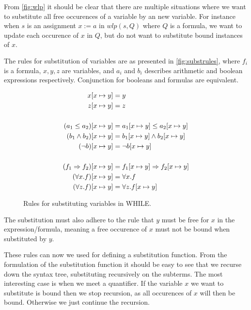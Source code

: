 From \autoref{fig:wlp} it should be clear that there are multiple situations where we want to substitute
all free occurences of a variable by an new variable.
For instance when $s$ is an assignment $x := a$ in $wlp(s, Q)$ where $Q$ is a formula,
we want to update each occurence of $x$ in $Q$, but do not want to substitute bound instances of $x$.

The rules for substitution of variables are as presented in \autoref{fig:substrules},
where $f_{i}$ is a formula, $x,y,z$ are variables, and $a_{i}$ and $b_{i}$ describes arithmetic and boolean expressions respectively. Conjunction for booleans and formulas are equivalent.

\begin{figure}[h!]
\begin{align*}
x[x \mapsto y] &= y \\
z[x \mapsto y] &= z \\
&\\
(a_{1} \leq a_{2})[x \mapsto y] &= a_{1}[x \mapsto y] \le a_{2}[x \mapsto y] \\
(b_{1} \wedge b_{2})[x \mapsto y] &= b_{1}[x \mapsto y] \wedge b_{2}[x \mapsto y] \\
(\neg b)[x \mapsto y] &= \neg b[x \mapsto y] \\
&\\
(f_{1} \Rightarrow f_{2})[x \mapsto y] &= f_{1}[x \mapsto y] \Rightarrow f_{2}[x \mapsto y] \\
(\forall x. f)[x \mapsto y] &=  \forall x. f\\
(\forall z. f)[x \mapsto y] &=  \forall z. f[x \mapsto y]\\
\end{align*}
\caption{Rules for substituting variables in WHILE.}
\label{fig:substrules}
\end{figure}

The substitution must also adhere to the rule that $y$ must be free for $x$ in the expression/formula,
meaning a free occurence of $x$ must not be bound when substituted by $y$.

These rules can now we used for defining a substitution function.
From the formulation of the substitution function it should be easy to see that we recurse down the syntax tree, substituting recursively on the subterms.
The most interesting case is when we meet a quantifier. If the variable $x$ we want to substitute is bound then we stop recursion, as all occurences of $x$ will then be bound.
Otherwise we just continue the recursion.

